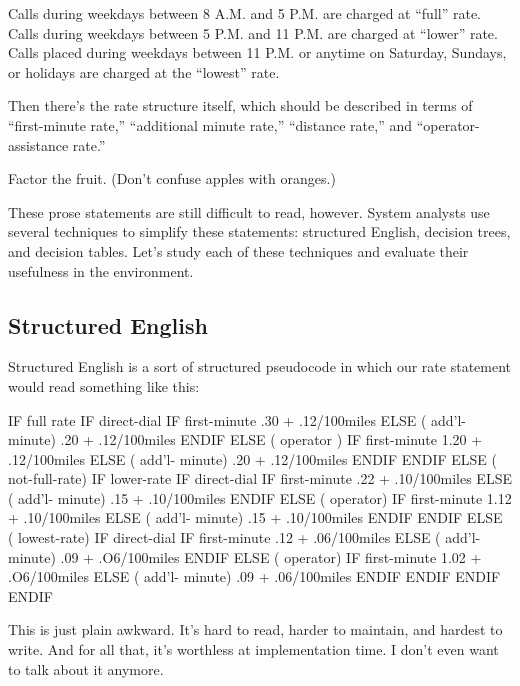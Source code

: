 \begin{tfquot}
Calls during weekdays between 8 A.M. and 5 P.M. are charged at ``full'' rate.
Calls during weekdays between 5 P.M. and 11 P.M. are charged at ``lower''
rate. Calls placed during weekdays between 11 P.M. or anytime on Saturday,
Sundays, or holidays are charged at the ``lowest'' rate.
\end{tfquot}
Then there's the rate structure itself, which should be described in
terms of ``first-minute rate,'' ``additional minute rate,'' ``distance
rate,'' and ``operator-assistance rate.''

\begin{tip}
Factor the fruit. (Don't confuse apples with oranges.)
\end{tip}
These prose statements are still difficult to read, however. System
analysts use several techniques to simplify these statements:
structured English, decision trees, and decision tables. Let's study
each of these techniques and evaluate their usefulness in the \Forth{}
environment.

\subsection{Structured English}%
%

Structured English is a sort of structured pseudocode in which our rate
statement would read something like this:

\begin{Code}[baselinestretch=0.95]
IF full rate
   IF direct-dial
      IF first-minute
	 .30 + .12/100miles
      ELSE ( add'l- minute)
	 .20 + .12/100miles
      ENDIF
   ELSE ( operator )
      IF first-minute
	 1.20 + .12/100miles
      ELSE ( add'l- minute)
	 .20 + .12/100miles
      ENDIF
   ENDIF
ELSE  ( not-full-rate)
   IF lower-rate
      IF direct-dial
	 IF first-minute
	    .22 + .10/100miles
	 ELSE ( add'l- minute)
	    .15 + .10/100miles
	 ENDIF
      ELSE ( operator)
	 IF first-minute
	    1.12 + .10/100miles
	 ELSE ( add'l- minute)
	    .15 + .10/100miles
	 ENDIF
      ENDIF
   ELSE ( lowest-rate)
      IF direct-dial
	 IF first-minute
	    .12 + .06/100miles
	 ELSE ( add'l- minute)
	    .09 + .O6/100miles
	 ENDIF
      ELSE ( operator)
	 IF first-minute
	    1.02 + .O6/100miles
	 ELSE ( add'l- minute)
	    .09 + .06/100miles
	 ENDIF
      ENDIF
   ENDIF
ENDIF
\end{Code}
This is just plain awkward. It's hard to read, harder to maintain, and
hardest to write. And for all that, it's worthless at implementation
time. I don't even want to talk about it anymore.%
%

